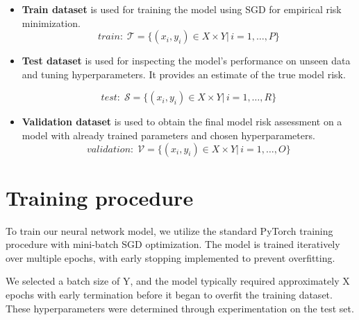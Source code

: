 \begin{itemize}
    \item \textbf{Train dataset} is used for training the model using \acrlong{SGD} for empirical risk minimization.
          \begin{equation}
              \label{eq:train}
              \textit{train}: \; \mathcal{T} = \{(x_i, y_i) \in X \times Y |\, i = 1,\dots, P\}
          \end{equation}
          \vspace{3mm}


    \item \textbf{Test dataset} is used for inspecting the model's performance on unseen data and tuning hyperparameters. It provides an estimate of the true model risk.

          \begin{equation}
              \label{eq:test}
              \textit{test}: \; \mathcal{S} = \{(x_i, y_i) \in X \times Y |\, i = 1,\dots, R\}
          \end{equation}
          \vspace{3mm}
    \item \textbf{Validation dataset} is used to obtain the final model risk assessment on a model with already trained parameters and chosen hyperparameters.
          \begin{equation}
              \label{eq:validation}
              \textit{validation}: \; \mathcal{V} = \{(x_i, y_i) \in X \times Y |\, i = 1,\dots, O\}
          \end{equation}
\end{itemize}

\section{Training procedure}

To train our neural network model, we utilize the standard PyTorch training procedure with mini-batch \acrfull{SGD} optimization. The model is trained iteratively over multiple epochs, with early stopping implemented to prevent overfitting.

We selected a batch size of Y, and the model typically required approximately X epochs with early termination before it began to overfit the training dataset. These hyperparameters were determined through experimentation on the test set.


